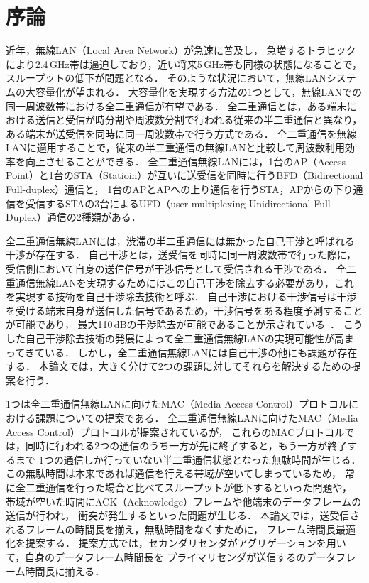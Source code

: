 \documentclass[master]{kuisthesis}		%
\begin{document}
\section{序論} \label{sec:intro}
近年，無線LAN（Local Area Network）が急速に普及し，
急増するトラヒックにより2.4\,GHz帯は逼迫しており，近い将来5\,GHz帯も同様の状態になることで，
スループットの低下が問題となる．
そのような状況において，無線LANシステムの大容量化が望まれる．
大容量化を実現する方法の1つとして，無線LANでの同一周波数帯における全二重通信が有望である．
全二重通信とは，ある端末における送信と受信が時分割や周波数分割で行われる従来の半二重通信と異なり，
ある端末が送受信を同時に同一周波数帯で行う方式である．
全二重通信を無線LANに適用することで，従来の半二重通信の無線LANと比較して周波数利用効率を向上させることができる．
全二重通信無線LANには，1台のAP（Access Point）と1台のSTA（Statioin）が互いに送受信を同時に行うBFD（Bidirectional Full-duplex）通信と，
1台のAPとAPへの上り通信を行うSTA，APからの下り通信を受信するSTAの3台によるUFD（user-multiplexing Unidirectional Full-Duplex）通信の2種類がある．
\par
全二重通信無線LANには，渋滞の半二重通信には無かった自己干渉と呼ばれる干渉が存在する．
自己干渉とは，送受信を同時に同一周波数帯で行った際に，
受信側において自身の送信信号が干渉信号として受信される干渉である．
全二重通信無線LANを実現するためにはこの自己干渉を除去する必要があり，これを実現する技術を自己干渉除去技術と呼ぶ．
自己干渉における干渉信号は干渉を受ける端末自身が送信した信号であるため，干渉信号をある程度予測することが可能であり，
最大110\,dBの干渉除去が可能であることが示されている~\cite{stanford,fdmac}．
こうした自己干渉除去技術の発展によって全二重通信無線LANの実現可能性が高まってきている．
しかし，全二重通信無線LANには自己干渉の他にも課題が存在する．
本論文では，大きく分けて2つの課題に対してそれらを解決するための提案を行う．

\par
1つは全二重通信無線LANに向けたMAC（Media Access Control）プロトコルにおける課題についての提案である．
全二重通信無線LANに向けたMAC（Media Access Control）プロトコル\cite{fdmac,janus,contra}が提案されているが，
これらのMACプロトコルでは，同時に行われる2つの通信のうち一方が先に終了すると，もう一方が終了するまで
1つの通信しか行っていない半二重通信状態となった無駄時間が生じる．
この無駄時間は本来であれば通信を行える帯域が空いてしまっているため，
常に全二重通信を行った場合と比べてスループットが低下するといった問題や，
帯域が空いた時間にACK（Acknowledge）フレームや他端末のデータフレームの送信が行われ，
衝突が発生するといった問題が生じる．
本論文では，送受信されるフレームの時間長を揃え，無駄時間をなくすために，
フレーム時間長最適化を提案する．
提案方式では，セカンダリセンダがアグリゲーションを用いて，自身のデータフレーム時間長を
プライマリセンダが送信するのデータフレーム時間長に揃える．
\end{document}
